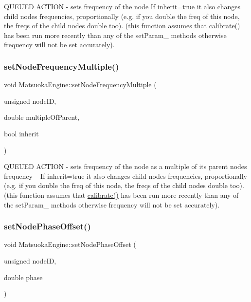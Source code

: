 Q\+U\+E\+U\+ED A\+C\+T\+I\+ON -\/ sets frequency of the node If inherit=true it also changes child nodes\textquotesingle{} frequencies, proportionally (e.\+g. if you double the freq of this node, the freqs of the child nodes double too). (this function assumes that \mbox{\hyperlink{classMatsuokaEngine_a68d6295dfa0d28e3bc9d743e763d6ee9}{calibrate()}} has been run more recently than any of the set\+Param\+\_\+ methods otherwise frequency will not be set accurately). \mbox{\label{classMatsuokaEngine_a304bbae799a46734b1db0ac679f032e4}} 
\subsubsection{\texorpdfstring{set\+Node\+Frequency\+Multiple()}{setNodeFrequencyMultiple()}}
{\footnotesize\ttfamily void Matsuoka\+Engine\+::set\+Node\+Frequency\+Multiple (\begin{DoxyParamCaption}\item[{unsigned}]{node\+ID,  }\item[{double}]{multiple\+Of\+Parent,  }\item[{bool}]{inherit }\end{DoxyParamCaption})}

Q\+U\+E\+U\+ED A\+C\+T\+I\+ON -\/ sets frequency of the node as a multiple of its parent node\textquotesingle{}s frequency ~\newline
If inherit=true it also changes child nodes\textquotesingle{} frequencies, proportionally (e.\+g. if you double the freq of this node, the freqs of the child nodes double too). (this function assumes that \mbox{\hyperlink{classMatsuokaEngine_a68d6295dfa0d28e3bc9d743e763d6ee9}{calibrate()}} has been run more recently than any of the set\+Param\+\_\+ methods otherwise frequency will not be set accurately). \mbox{\label{classMatsuokaEngine_a858deaa3246c884cc0693b494e398849}} 
\subsubsection{\texorpdfstring{set\+Node\+Phase\+Offset()}{setNodePhaseOffset()}}
{\footnotesize\ttfamily void Matsuoka\+Engine\+::set\+Node\+Phase\+Offset (\begin{DoxyParamCaption}\item[{unsigned}]{node\+ID,  }\item[{double}]{phase }\end{DoxyParamCaption})}

